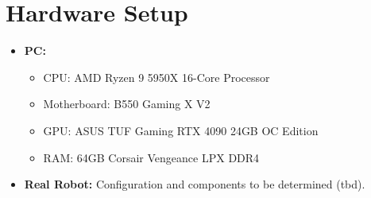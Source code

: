 \section{Hardware Setup}
\begin{itemize}
    \item \textbf{PC:}
    \begin{itemize}
        \item CPU: AMD Ryzen 9 5950X 16-Core Processor
        \item Motherboard: B550 Gaming X V2
        \item GPU: ASUS TUF Gaming RTX 4090 24GB OC Edition
        \item RAM: 64GB Corsair Vengeance LPX DDR4
    \end{itemize}
    \item \textbf{Real Robot:} Configuration and components to be determined (tbd).
\end{itemize}

